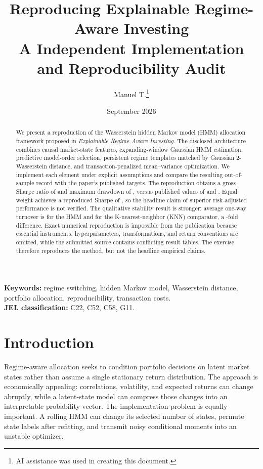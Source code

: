 \documentclass[11pt]{article}
\title{\textbf{Reproducing Explainable Regime-Aware Investing}\\
\large A Independent Implementation and Reproducibility Audit}
\author{Manuel T.\thanks{AI assistance was used in creating this document.}}
\date{September 2026}
\begin{document}
\maketitle

\begin{abstract}
We present a reproduction of the Wasserstein hidden Markov model (HMM) allocation framework proposed in \emph{Explainable Regime Aware Investing}. The disclosed architecture combines causal market-state features, expanding-window Gaussian HMM estimation, predictive model-order selection, persistent regime templates matched by Gaussian 2-Wasserstein distance, and transaction-penalized mean--variance optimization. We implement each element under explicit assumptions and compare the resulting out-of-sample record with the paper's published targets. The reproduction obtains a gross Sharpe ratio of \RepHMMSharpe{} and maximum drawdown of \RepHMMMaxDD{}, versus published values of \PubHMMSharpe{} and \PubHMMMaxDD{}. Equal weight achieves a reproduced Sharpe of \RepEqualSharpe{}, so the headline claim of superior risk-adjusted performance is not verified. The qualitative stability result is stronger: average one-way turnover is \RepHMMTurnover{} for the HMM and \RepKNNTurnover{} for the K-nearest-neighbor (KNN) comparator, a \TurnoverRatio{}-fold difference. Exact numerical reproduction is impossible from the publication because essential instruments, hyperparameters, transformations, and return conventions are omitted, while the submitted source contains conflicting result tables. The exercise therefore reproduces the method, but not the headline empirical claims.
\end{abstract}

\noindent\textbf{Keywords:} regime switching, hidden Markov model, Wasserstein distance, portfolio allocation, reproducibility, transaction costs.\\
\textbf{JEL classification:} C22, C52, C58, G11.

\section{Introduction}

Regime-aware allocation seeks to condition portfolio decisions on latent market states rather than assume a single stationary return distribution. The approach is economically appealing: correlations, volatility, and expected returns can change abruptly, while a latent-state model can compress those changes into an interpretable probability vector. The implementation problem is equally important. A rolling HMM can change its selected number of states, permute state labels after refitting, and transmit noisy conditional moments into an unstable optimizer.
\end{document}
